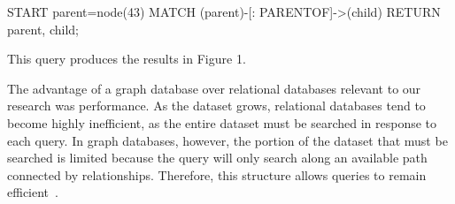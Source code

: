 \documentclass[12pt]{article}
\begin{document}
START parent=node(43)
MATCH (parent)-[: PARENTOF]->(child) 
RETURN parent, child;

This query produces the results in Figure 1.

The advantage of a graph database over relational databases relevant to our research was performance. As the dataset grows, relational databases tend to become highly inefficient, as the entire dataset must be searched in response to each query. In graph databases, however, the portion of the dataset that must be searched is limited because the query will only search along an available path connected by relationships. Therefore, this structure allows queries to remain efficient~\cite{GraphDatabases:2013}.







\end{document}
